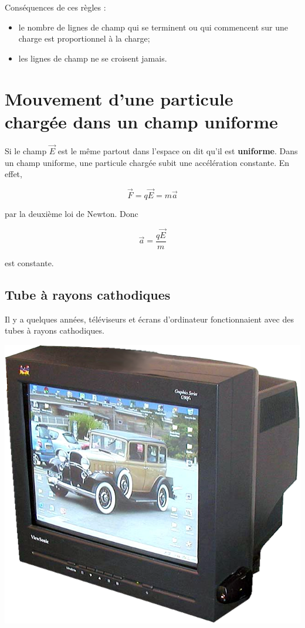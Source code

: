   Conséquences de ces règles :

  \begin{itemize}
    \item le nombre de lignes de champ qui se terminent ou qui commencent sur une
      charge est proportionnel à la charge;
    \item les lignes de champ ne se croisent jamais.
  \end{itemize}


\sectionline


\section{Mouvement d'une particule chargée dans un champ uniforme}



  Si le champ $\vec{E}$ est le même partout dans l'espace on dit qu'il est
  \textbf{uniforme}. Dans un champ uniforme, une particule chargée subit
  une accélération constante. En effet,

  $$\vec{F} = q\vec{E} = m\vec{a}$$

  par la deuxième loi de Newton. Donc

  $$\vec{a} = \frac{q\vec{E}}{m}$$

  est constante.


\subsection*{Tube à rayons cathodiques}

  Il y a quelques années, téléviseurs et écrans d'ordinateur fonctionnaient
  avec des tubes à rayons cathodiques.

  \begin{center}
    \includegraphics[scale=0.2]{02-champ-electrique/figures/viewsonic-crt.png}
  \end{center}

